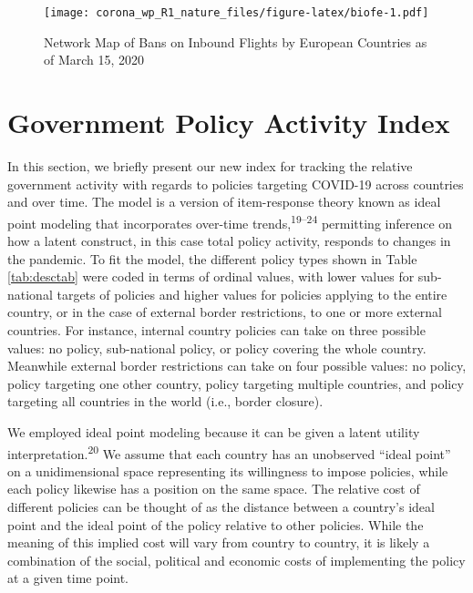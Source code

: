 \documentclass[
]{article}
\begin{document}
\begin{figure}
\centering
\texttt{[image: corona\_wp\_R1\_nature\_files/figure-latex/biofe-1.pdf]}
\caption{\label{fig:biofe}Network Map of Bans on Inbound Flights by European Countries as of March 15, 2020}
\end{figure}

\hypertarget{government-policy-activity-index}{%
\section*{Government Policy Activity Index}\label{government-policy-activity-index}}

In this section, we briefly present our new index for tracking the relative government activity with regards to policies targeting COVID-19 across countries and over time. The model is a version of item-response theory known as ideal point modeling that incorporates over-time trends,\textsuperscript{19--24} permitting inference on how a latent construct, in this case total policy activity, responds to changes in the pandemic. To fit the model, the different policy types shown in Table \ref{tab:desctab} were coded in terms of ordinal values, with lower values for sub-national targets of policies and higher values for policies applying to the entire country, or in the case of external border restrictions, to one or more external countries. For instance, internal country policies can take on three possible values: no policy, sub-national policy, or policy covering the whole country. Meanwhile external border restrictions can take on four possible values: no policy, policy targeting one other country, policy targeting multiple countries, and policy targeting all countries in the world (i.e., border closure).

We employed ideal point modeling because it can be given a latent utility interpretation.\textsuperscript{20} We assume that each country has an unobserved ``ideal point'' on a unidimensional space representing its willingness to impose policies, while each policy likewise has a position on the same space. The relative cost of different policies can be thought of as the distance between a country's ideal point and the ideal point of the policy relative to other policies. While the meaning of this implied cost will vary from country to country, it is likely a combination of the social, political and economic costs of implementing the policy at a given time point.
\end{document}
